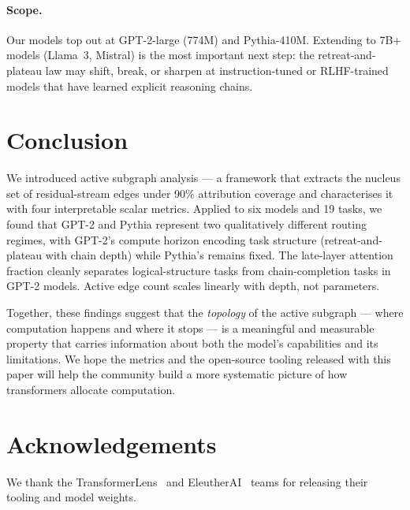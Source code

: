 \documentclass{article}
\begin{document}
\paragraph{Scope.}
Our models top out at GPT-2-large (774M) and Pythia-410M.
Extending to 7B+ models (Llama~3, Mistral) is the most important
next step: the retreat-and-plateau law may shift, break, or sharpen
at instruction-tuned or RLHF-trained models that have learned explicit
reasoning chains.


\section{Conclusion}

We introduced active subgraph analysis — a framework that extracts
the nucleus set of residual-stream edges under 90\% attribution
coverage and characterises it with four interpretable scalar metrics.
Applied to six models and 19 tasks, we found that GPT-2 and Pythia
represent two qualitatively different routing regimes, with GPT-2's
compute horizon encoding task structure (retreat-and-plateau with chain
depth) while Pythia's remains fixed.
The late-layer attention fraction cleanly separates logical-structure
tasks from chain-completion tasks in GPT-2 models.
Active edge count scales linearly with depth, not parameters.

Together, these findings suggest that the \emph{topology} of
the active subgraph — where computation happens and where it stops —
is a meaningful and measurable property that carries information about
both the model's capabilities and its limitations.
We hope the metrics and the open-source tooling released with this
paper will help the community build a more systematic picture of how
transformers allocate computation.


\section*{Acknowledgements}

We thank the TransformerLens~\citep{nanda2022transformerlens} and
EleutherAI~\citep{biderman2023pythia} teams for releasing their tooling
and model weights.
\end{document}
